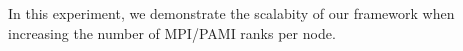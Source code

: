In this experiment, we demonstrate the scalabity of our framework when increasing the number of MPI/PAMI ranks per node.
